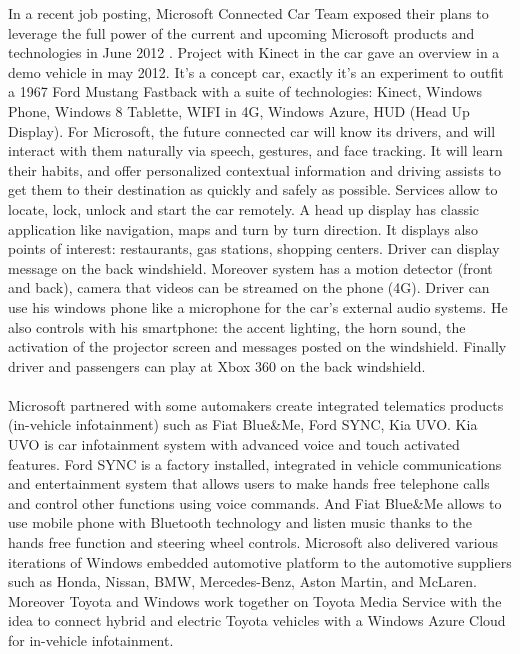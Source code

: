\documentclass[a4paper]{article}
\begin{document}
In a recent job posting, Microsoft Connected Car Team exposed their plans to leverage the full power of the current and upcoming Microsoft products and technologies in June 2012 \cite{West}. Project with Kinect in the car gave an overview in a demo vehicle in may 2012. It's a concept car, exactly it's an experiment to outfit a 1967 Ford Mustang Fastback with a suite of technologies: Kinect, Windows Phone, Windows 8 Tablette, WIFI in 4G, Windows Azure, HUD (Head Up Display). For Microsoft, the future connected car will know its drivers, and will interact with them naturally via speech, gestures, and face tracking. It will learn their habits, and offer personalized contextual information and driving assists to get them to their destination as quickly and safely as possible. Services allow to locate, lock, unlock and start the car remotely. A head up display has classic application like navigation, maps and turn by turn direction. It displays also points of interest: restaurants, gas stations, shopping centers. Driver can display message on the back windshield. Moreover system has a motion detector (front and back), camera that videos can be streamed on the phone (4G). Driver can use his windows phone like a microphone for the car's external audio systems. He also controls with his smartphone: the accent lighting, the horn sound, the activation of the projector screen and messages posted on the windshield. Finally driver and passengers can play at Xbox 360 on the back windshield.

\paragraph{}Microsoft partnered with some automakers create integrated telematics products (in-vehicle infotainment) such as Fiat Blue\&Me, Ford SYNC, Kia UVO. Kia UVO is car infotainment system with advanced voice and touch activated features. Ford SYNC is a factory installed, integrated in vehicle communications and entertainment system that allows users to make hands free telephone calls and control other functions using voice commands. And Fiat Blue\&Me allows to use mobile phone with Bluetooth technology and listen music thanks to the hands free function and steering wheel controls. Microsoft also delivered various iterations of Windows embedded automotive platform to the automotive suppliers such as Honda, Nissan, BMW, Mercedes-Benz, Aston Martin, and McLaren. Moreover Toyota and Windows work together on Toyota Media Service with the idea to connect hybrid and electric Toyota vehicles with a Windows Azure Cloud for in-vehicle infotainment.
\end{document}
